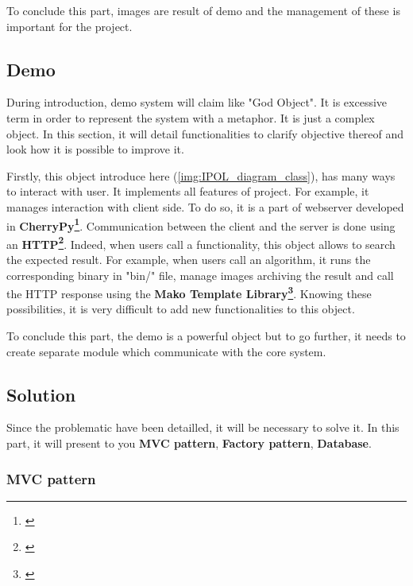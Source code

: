 To conclude this part, images are result of demo and the management of these is important
for the project.

\subsection{Demo}
During introduction, demo system will claim like "God Object". It is excessive term in
order to represent the system with a metaphor. It is just a complex object.
In this section, it will detail functionalities to clarify objective thereof and
look how it is possible to improve it.\\
\setlength{\parindent}{0cm}

Firstly, this object introduce here (\ref{img:IPOL_diagram_class}), has many ways to
interact with user. It implements all features of project. For example, it manages
interaction with client side. To do so, it is a part of webserver developed in
\textbf{CherryPy\footnote{\cite{CherryPy}}}.
Communication between the client and the server is done using an
\textbf{HTTP\footnote{\cite{HTTP}}}. Indeed, when users call a functionality,
this object allows to search the expected result. For example, when users call an algorithm,
it runs the corresponding binary in "bin/" file, manage images archiving the result
and call the HTTP response using the \textbf{Mako Template Library\footnote{\cite{Mako}}}.
Knowing these possibilities, it is very difficult to add new functionalities to this object.
\\
\setlength{\parindent}{0cm}

To conclude this part, the demo is a powerful object but to go further, it needs to create
separate module which communicate with the core system.

\subsection{Solution}
\setlength{\parindent}{1cm}
\hspace{1cm}

Since the problematic have been detailled, it will be necessary to solve it. In this part,
it will present to you \textbf{MVC pattern}, \textbf{Factory pattern}, \textbf{Database}.

\subsubsection{MVC pattern}
\setlength{\parindent}{1cm}
\hspace{1cm}

